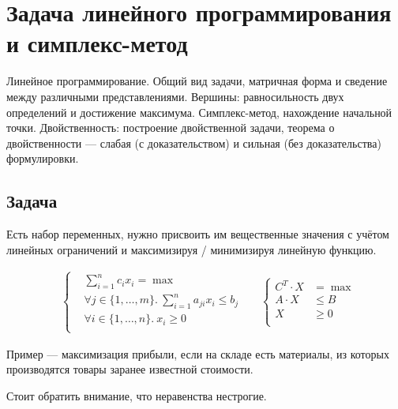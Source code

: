 \section{Задача линейного программирования и симплекс-метод}
Линейное программирование.
Общий вид задачи, матричная форма и
сведение между различными представлениями.
Вершины: равносильность двух определений и достижение максимума.
Симплекс-метод, нахождение начальной точки.
Двойственность: построение двойственной
задачи, теорема о двойственности --- слабая (с доказательством)
и сильная (без доказательства) формулировки.

\subsection{Задача}
Есть набор переменных, нужно присвоить им вещественные значения
с учётом линейных ограничений
и максимизируя / минимизируя линейную функцию.

\begin{align*}
    &
    \left\{
    \begin{aligned}
        & \sum_{i=1}^n c_i x_i = \max \\
        & \forall j \in \{1, \ldots, m\}.~\sum_{i=1}^n a_{ji} x_i \le b_j \\
        & \forall i \in \{1, \ldots, n\}.~x_i \ge 0 \\
    \end{aligned}
    \right.
    &&
    \left\{
    \begin{aligned}
        C^T \cdot X & = \max \\
        A \cdot X & \le B \\
        X & \ge 0 \\
    \end{aligned}
    \right.
\end{align*}

Пример --- максимизация прибыли,
если на складе есть материалы,
из которых производятся товары
заранее известной стоимости.

Стоит обратить внимание, что неравенства нестрогие.

